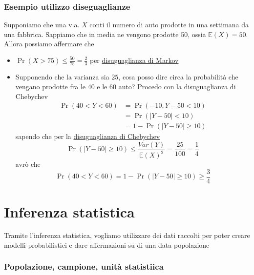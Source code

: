 \subsubsection*{Esempio utilizzo diseguaglianze}
Supponiamo che una v.a. $ X $ conti il numero di auto prodotte in una settimana da una fabbrica. Sappiamo che in media ne vengono prodotte 50, ossia $ \mathbb{E}\left(X\right) = 50 $. Allora possiamo affermare che
\begin{itemize}
	\item $\Pr\left(X > 75\right) \le \frac{50}{75} = \frac{2}{3} $ per \underline{disuguaglianza di Markov}
	\item Supponendo che la varianza sia $ 25 $, cosa posso dire circa la probabilità che vengano prodotte fra le 40 e le 60 auto? Procedo con la disuguaglianza di Chebychev
	      \begin{align*}
		      \Pr \left(40 < Y < 60 \right) & = \Pr \left(-10, Y- 50 < 10\right)             \\
		                                    & = \Pr\left(\left|Y-50\right| < 10\right)       \\
		                                    & = 1 -\Pr\left(\left|Y- 50\right| \ge 10\right)
	      \end{align*}
	      sapendo che per la \underline{disuguaglianza di Chebychev}
	      \[
		      \Pr\left(\left| Y - 50\right| \ge  10\right)\le \frac{Var \left(Y\right)}{\mathbb{E} \left(X\right)^2 } = \frac{25}{100} = \frac{1}{4}
	      \]
	      avrò che
	      \[
		      \Pr\left(40 < Y < 60\right) = 1 -\Pr\left(\left|Y - 50\right| \ge  10\right) \ge \frac{3}{4}
	      \]
\end{itemize}
\section{Inferenza statistica}
Tramite l'inferenza statistica, vogliamo utilizzare dei dati raccolti per poter creare modelli probabilistici e dare affermazioni su di una data popolazione
\subsubsection*{Popolazione, campione, unità statistiica}
\begin{center}
\end{center}
